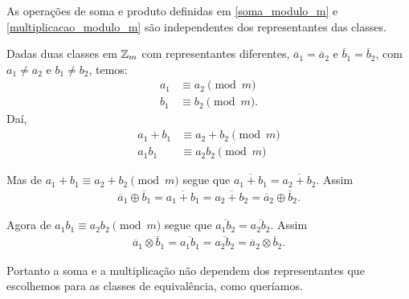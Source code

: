\begin{proposicao}
	As opera{\c c}{\~o}es de soma e produto definidas em \eqref{soma_modulo_m} e \eqref{multiplicacao_modulo_m} s{\~a}o independentes dos representantes das classes.
\end{proposicao}
\begin{prova}
	Dadas duas classes em $\mathbb{Z}_m$ com representantes diferentes, $\overline{a}_{1} = \overline{a}_{2}$ e  $\overline{b}_{1} = \overline{b}_{2}$, com $a_{1}\ne a_{2}$ e $b_{1}\ne b_{2}$,  temos:
            \begin{align*}
                a_1 &\equiv a_2 \pmod m\\
                b_1 &\equiv b_2 \pmod m.
            \end{align*}
            Daí,
            \begin{align*}
                a_1 + b_1 &\equiv a_2 + b_2 \pmod m\\
                a_1b_1 &\equiv a_2b_2 \pmod m
            \end{align*}
    
        Mas de $a_1 + b_1 \equiv a_2 + b_2 \pmod m$ segue que $\overline{a_1 + b_1} = \overline{a_2 + b_2}$. Assim
        \begin{align*}
            \overline{a}_{1}\oplus \overline{b}_{1} = \overline{a_{1}+b_{1}} = \overline{a_{2} + b_{2}} = \overline{a}_{2}\oplus \overline{b}_{2}.
        \end{align*}

        Agora de $a_1b_1 \equiv a_2b_2 \pmod m$  segue que $\overline{a_1b_2} =  \overline{a_2b_2}$. Assim
        \begin{align*}
            \overline{a}_{1}\otimes \overline{b}_{1} = \overline{a_{1}b_{1}} = \overline{a_{2}b_{2}} = \overline{a}_{2}\otimes\overline{b}_{2}.
        \end{align*}

        Portanto a soma e a multiplicação não dependem dos representantes que escolhemos para as classes de equivalência, como queríamos.\hspace{.3cm}
\end{prova}

